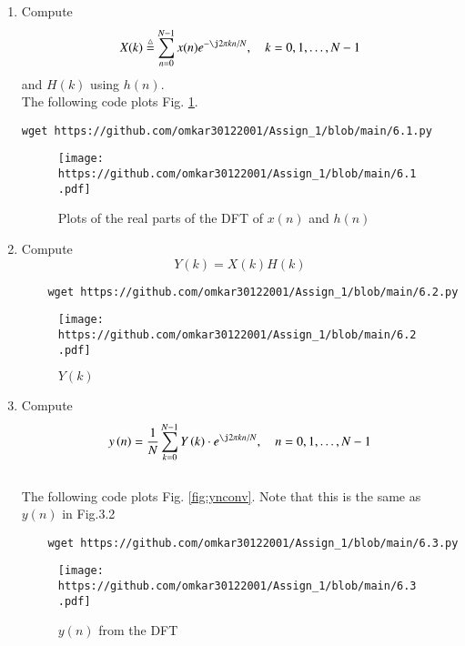 \documentclass[journal,12pt,twocolumn]{IEEEtran}
\renewcommand\thesection{\arabic{section}}
\begin{document}
\begin{enumerate}[label=\thesection.\arabic*
	,ref=\thesection.\theenumi]
	\item
Compute
\begin{equation}
	X(k) \define \sum _{n=0}^{N-1}x(n) e^{-\j2\pi kn/N}, \quad k = 0,1,\dots, N-1
\end{equation}
and $H(k)$ using $h(n)$.\\
\solution The following code plots Fig. \ref{fig:6.1}.
\begin{lstlisting}
wget https://github.com/omkar30122001/Assign_1/blob/main/6.1.py
\end{lstlisting}
\begin{figure}[!ht]
	\centering
	\texttt{[image: https://github.com/omkar30122001/Assign\_1/blob/main/6.1.pdf]}
	\caption{Plots of the real parts of the DFT of $x(n)$ and $h(n)$}
	\label{fig:6.1}
\end{figure}
	
\item Compute 
\begin{equation}\label{6.2}
	Y(k) = X(k)H(k)
\end{equation}
\solution 
\begin{lstlisting}
	wget https://github.com/omkar30122001/Assign_1/blob/main/6.2.py
\end{lstlisting}
\begin{figure}[!ht]
	\centering
	\texttt{[image: https://github.com/omkar30122001/Assign\_1/blob/main/6.2.pdf]}
	\caption{$Y(k)$}
\end{figure}
\item Compute
\begin{equation} \label{6.3}
	y\brak{n}={\frac {1}{N}}\sum _{k=0}^{N-1}Y\brak{k}\cdot e^{\j 2\pi kn/N},\quad n = 0,1,\dots, N-1
\end{equation}
\\
\solution The following code plots Fig. \ref{fig:ynconv}. Note that this is the same as 
	$y(n)$ in  Fig.3.2 
%
\begin{lstlisting}
	wget https://github.com/omkar30122001/Assign_1/blob/main/6.3.py
\end{lstlisting}
	
\begin{figure}[!ht]
	\centering
	\texttt{[image: https://github.com/omkar30122001/Assign\_1/blob/main/6.3.pdf]}
	\caption{$y(n)$ from the DFT}
	\label{fig:yndft}
\end{figure}
	

\end{enumerate}
\end{document}
